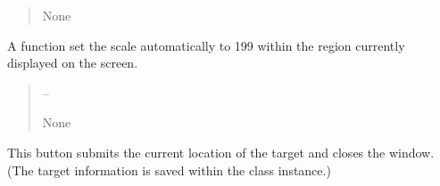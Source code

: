 \documentclass[letterpaper,11pt,english]{sphinxmanual}
\begin{document}
\begin{savenotes}
\begin{fulllineitems}
\begin{savenotes}
\begin{fulllineitems}
\begin{quote}
\begin{description}
\sphinxAtStartPar
None

\end{description}\end{quote}

\end{fulllineitems}\end{savenotes}


\begin{savenotes}\begin{fulllineitems}
\label{\detokenize{code/opihiexarata.gui.selector:opihiexarata.gui.selector.TargetSelectorWindow.__connect_push_button_scale_1_99}}
\pysigstartsignatures
{}
\pysigstopsignatures
\sphinxAtStartPar
A function set the scale automatically to 1\sphinxhyphen{}99 within the
region currently displayed on the screen.
\begin{quote}\begin{description}
\sphinxAtStartPar
{} – 

\sphinxAtStartPar
None

\end{description}\end{quote}

\end{fulllineitems}\end{savenotes}


\begin{savenotes}\begin{fulllineitems}
\label{\detokenize{code/opihiexarata.gui.selector:opihiexarata.gui.selector.TargetSelectorWindow.__connect_push_button_submit_target}}
\pysigstartsignatures
{}
\pysigstopsignatures
\sphinxAtStartPar
This button submits the current location of the target and closes
the window. (The target information is saved within the class
instance.)


\end{fulllineitems}
\end{savenotes}
\end{fulllineitems}
\end{savenotes}
\end{document}
